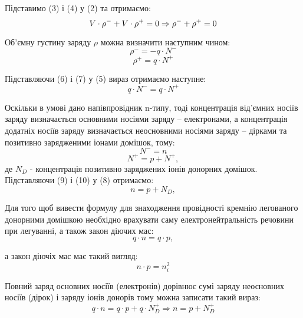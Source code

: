 \documentclass[a4paper,12pt]{article}
\begin{document}
Підставимо (3) і (4) у (2) та отримаємо:
\begin{equation}
V\cdot \rho^- + V\cdot \rho^+ = 0 \Rightarrow \rho^- +  \rho^+ =0\\
\end{equation}

Об’ємну густину заряду $\rho$ можна визначити наступним чином:
\begin{equation}
\rho^- = -q\cdot N^-
\end{equation}
\begin{equation}
\rho^+ = q\cdot N^+
\end{equation}

Підставляючи (6) і (7) у (5) вираз отримаємо наступне:
\begin{equation}
q\cdot N^- = q\cdot N^+ 
\end{equation}

Оскільки в умові дано напівпровідник n-типу, тоді концентрація від’ємних носіїв заряду визначається основними носіями заряду – електронами, а концентрація додатніх носіїв заряду визначається неосновними носіями заряду – дірками та позитивно зарядженими іонами домішок, тому:
\begin{equation}
N^- = n
\end{equation}
\begin{equation}
N^+ = p + N^+,
\end{equation}
де $N_D$ - концентрація позитивно заряджених іонів донорних домішок.\\

Підставляючи (9) і (10) у (8) отримаємо:
\begin{equation}
n = p + N_D,
\end{equation}


Для того щоб вивести формулу для знаходження провідності кремнію легованого донорними домішкою необхідно врахувати саму електронейтральність речовини при легуванні, а також закон діючих мас:
\begin{equation}
q\cdot n  = q\cdot p,
\label{eq:ref}
\end{equation}

а закон діючіх мас має такий вигляд:
\begin{equation}
n\cdot p = n_i^2
\label{eq:ref}
\end{equation}

Повний заряд основних носіїв (електронів) дорівнює сумі заряду неосновних носіїв (дірок) і заряду іонів донорів тому можна записати такий вираз:\\
\begin{equation}
 q\cdot n = q\cdot p + q\cdot N_D^+ \Rightarrow n = p + N_D^+
\label{eq:ref}
\end{equation}
\end{document}
